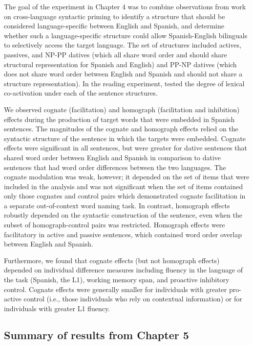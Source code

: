 The goal of the experiment in Chapter 4 was to combine observations from work on cross-language syntactic priming to identify a structure that should be considered language-specific between English and Spanish, and determine whether such a language-specific structure could allow Spanish-English bilinguals to selectively access the target language. The set of structures included actives, passives, and NP-PP datives (which all share word order and should share structural representation for Spanish and English) and PP-NP datives (which does not share word order between English and Spanish and should not share a structure representation). In the reading experiment, tested the degree of lexical co-activation under each of the sentence structures. 

We observed cognate (facilitation) and homograph (facilitation and inhibition) effects during the production of target words that were embedded in Spanish sentences. The magnitudes of the cognate and homograph effects relied on the syntactic structure of the sentence in which the targets were embedded. Cognate effects were significant in all sentences, but were greater for dative sentences that shared word order between English and Spanish in comparison to dative sentences that had word order differences between the two languages. The cognate modulation was weak, however; it depended on the set of items that were included in the analysis and was not significant when the set of items contained only those cognates and control pairs which demonstrated cognate facilitation in a separate out-of-context word naming task. In contrast, homograph effects robustly depended on the syntactic construction of the sentence, even when the subset of homograph-control pairs was restricted. Homograph effects were facilitatory in active and passive sentences, which contained word order overlap between English and Spanish. 

Furthermore, we found that cognate effects (but not homograph effects) depended on individual difference measures including fluency in the language of the task (Spanish, the L1), working memory span, and proactive inhibitory control. Cognate effects were generally smaller for individuals with greater pro-active control (i.e., those individuals who rely on contextual information) or for individuals with greater L1 fluency. 

\subsection{Summary of results from Chapter 5}
\label{summaryofresultsfromchapter5}

